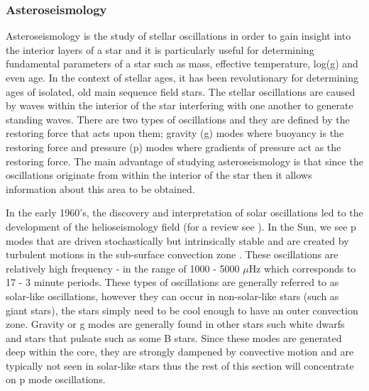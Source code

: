 \subsubsection{Asteroseismology}
Asteroseismology is the study of stellar oscillations in order to gain insight into the interior layers of a star and it is particularly useful for determining fundamental parameters of a star such as mass, effective temperature, log(g) and even age. In the context of stellar ages, it has been revolutionary for determining ages of isolated, old main sequence field stars. The stellar oscillations are caused by waves within the interior of the star interfering with one another to generate standing waves. There are two types of oscillations and they are defined by the restoring force that acts upon them; gravity (g) modes where buoyancy is the restoring force and pressure (p) modes where gradients of pressure act as the restoring force. The main advantage of studying asteroseismology is that since the oscillations originate from within the interior of the star then it allows information about this area to be obtained.

In the early 1960's, the discovery and interpretation of solar oscillations led to the development of the helioseismology field (for a review see \citealt{Christensen-Dalsgaard_2002}). In the Sun, we see p modes that are  driven stochastically but intrinsically stable and are created by turbulent motions in the sub-surface convection zone \citep{Samadi_Goupil_2001}. These oscillations are relatively high frequency - in the range of 1000 - 5000 $\mu$Hz which corresponds to 17 - 3 minute periods. These types of oscillations are generally referred to as solar-like oscillations, however they can occur in non-solar-like stars (such as giant stars), the stars simply need to be cool enough to have an outer convection zone. Gravity or g modes are generally found in other stars such white dwarfs and stars that pulsate such as some B stars. Since these modes are generated deep within the core, they are strongly dampened by convective motion and are typically not seen in solar-like stars thus the rest of this section will concentrate on p mode oscillations.

